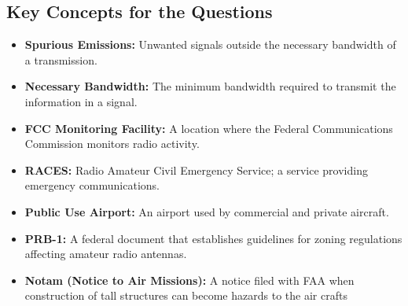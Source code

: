 \subsection*{Key Concepts for the Questions}
\begin{itemize}
    \item \textbf{Spurious Emissions:} Unwanted signals outside the necessary bandwidth of a transmission.
    \item \textbf{Necessary Bandwidth:} The minimum bandwidth required to transmit the information in a signal.
    \item \textbf{FCC Monitoring Facility:} A location where the Federal Communications Commission monitors radio activity.
    \item \textbf{RACES:} Radio Amateur Civil Emergency Service; a service providing emergency communications.
    \item \textbf{Public Use Airport:} An airport used by commercial and private aircraft.
    \item \textbf{PRB-1:}  A federal document that establishes guidelines for zoning regulations affecting amateur radio antennas.
    \item \textbf{Notam (Notice to Air Missions):}  A notice filed with FAA when construction of tall structures can become hazards to the air crafts
\end{itemize}


